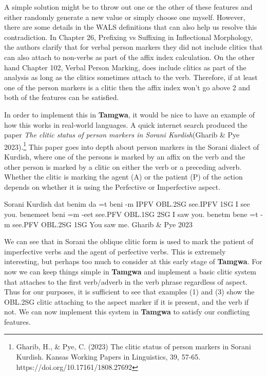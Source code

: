 \documentclass[a4paper,12pt,twoside,openright]{memoir}
\begin{document}
A simple solution might be to throw out one or the other of these features and either randomly generate a new value or simply choose one myself.  However, there are some details in the WALS definitions that can also help us resolve this contradiction.  In Chapter 26, Prefixing vs Suffixing in Inflectional Morphology, the authors clarify that for verbal person markers they did not include clitics that can also attach to non-verbs as part of the affix index calculation.  On the other hand Chapter 102, Verbal Person Marking, does include clitics as part of the analysis as long as the clitics sometimes attach to the verb.  Therefore, if at least one of the person markers is a clitic then the affix index won't go above 2 and both of the features can be satisfied.

    In order to implement this in \textbf{Tamgwa}, it would be nice to have an example of how this works in real-world languages.  A quick internet search produced the paper \textit{The clitic status of person markers in Sorani Kurdish}(Gharib \& Pye 2023).\footnote{Gharib, H., \& Pye, C. (2023) The clitic status of person markers in Sorani Kurdish. Kansas Working Papers in Linguistics, 39, 57-65. https://doi.org/10.17161/1808.27692}  This paper goes into depth about person markers in the Sorani dialect of Kurdish, where one of the persons is marked by an affix on the verb and the other person is marked by a clitic on either the verb or a preceding adverb.  Whether the clitic is marking the agent (A) or the patient (P) of the action depends on whether it is using the Perfective or Imperfective aspect.

\begin{examples}
    \ex
    \lect Sorani Kurdish
    \words {} dat  benim
    \bits da =t beni -m
    \gloss IPFV OBL.2SG see.IPFV 1SG
    \tr I see you.
    \ex
    \words {} benemeet
    \bits beni =m -eet
    \gloss see.PFV OBL.1SG 2SG
    \tr I saw you.
    \ex
    \words {} benetm
    \bits bene =t -m
    \gloss see.PFV OBL.2SG 1SG
    \tr You saw me.
    \source Gharib \& Pye 2023
\end{examples}

    We can see that in Sorani the oblique clitic form is used to mark the patient of imperfective verbs and the agent of perfective verbs.  This is extremely interesting, but perhaps too much to consider at this early stage of \textbf{Tamgwa}.  For now we can keep things simple in \textbf{Tamgwa} and implement a basic clitic system that attaches to the first verb/adverb in the verb phrase regardless of aspect.  Thus for our purposes, it is sufficient to see that examples (1) and (3) show the OBL.2SG clitic attaching to the aspect marker if it is present, and the verb if not.  We can now implement this system in \textbf{Tamgwa} to satisfy our conflicting features.
\end{document}
